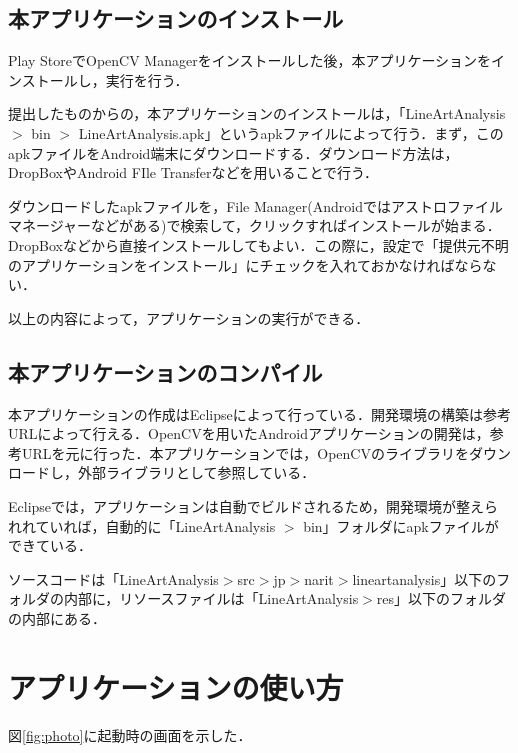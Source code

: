 \documentclass{jarticle}
\begin{document}
\subsection{本アプリケーションのインストール}
Play StoreでOpenCV Managerをインストールした後，本アプリケーションをインストールし，実行を行う．

提出したものからの，本アプリケーションのインストールは，「LineArtAnalysis $>$ bin $>$ LineArtAnalysis.apk」というapkファイルによって行う．まず，このapkファイルをAndroid端末にダウンロードする．ダウンロード方法は，DropBox\cite{ref:dropbox}やAndroid FIle Transfer\cite{ref:file_transfer}などを用いることで行う．

ダウンロードしたapkファイルを，File Manager(Androidではアストロファイルマネージャー\cite{ref:astro}などがある)で検索して，クリックすればインストールが始まる．DropBoxなどから直接インストールしてもよい．この際に，設定で「提供元不明のアプリケーションをインストール」にチェックを入れておかなければならない．

以上の内容によって，アプリケーションの実行ができる．


\subsection{本アプリケーションのコンパイル}
本アプリケーションの作成はEclipseによって行っている．開発環境の構築は参考URL\cite{ref:android_dev}によって行える．OpenCVを用いたAndroidアプリケーションの開発は，参考URL\cite{ref:opencv_android}を元に行った．本アプリケーションでは，OpenCVのライブラリをダウンロードし，外部ライブラリとして参照している．

Eclipseでは，アプリケーションは自動でビルドされるため，開発環境が整えられれていれば，自動的に「LineArtAnalysis $>$ bin」フォルダにapkファイルができている．

ソースコードは「LineArtAnalysis$>$src$>$jp$>$narit$>$lineartanalysis」以下のフォルダの内部に，リソースファイルは「LineArtAnalysis$>$res」以下のフォルダの内部にある．





\section{アプリケーションの使い方}
図\ref{fig:photo}に起動時の画面を示した．
\end{document}
